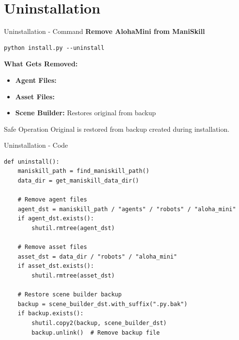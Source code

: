\documentclass[aspectratio=169]{beamer}
\begin{document}
\section{Uninstallation}

\begin{frame}[fragile]{Uninstallation - Command}
\textbf{Remove AlohaMini from ManiSkill}

\vspace{0.5cm}

\begin{lstlisting}
python install.py --uninstall
\end{lstlisting}

\vspace{0.5cm}

\textbf{What Gets Removed:}
\begin{itemize}
    \item \textbf{Agent Files:} 
    \item \textbf{Asset Files:} 
    \item \textbf{Scene Builder:} Restores original from  backup
\end{itemize}

\vspace{0.3cm}

\begin{block}{Safe Operation}
Original  is restored from backup created during installation.
\end{block}
\end{frame}

\begin{frame}[fragile]{Uninstallation - Code}
\begin{lstlisting}
def uninstall():
    maniskill_path = find_maniskill_path()
    data_dir = get_maniskill_data_dir()

    # Remove agent files
    agent_dst = maniskill_path / "agents" / "robots" / "aloha_mini"
    if agent_dst.exists():
        shutil.rmtree(agent_dst)

    # Remove asset files
    asset_dst = data_dir / "robots" / "aloha_mini"
    if asset_dst.exists():
        shutil.rmtree(asset_dst)

    # Restore scene builder backup
    backup = scene_builder_dst.with_suffix(".py.bak")
    if backup.exists():
        shutil.copy2(backup, scene_builder_dst)
        backup.unlink()  # Remove backup file
\end{lstlisting}
\end{frame}
\end{document}
